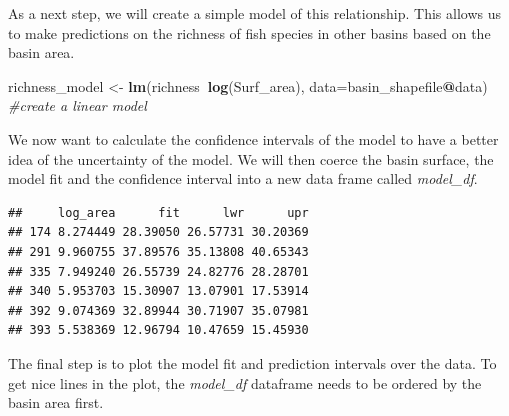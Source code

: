 \documentclass[
]{book}
\newenvironment{Shaded}{\begin{snugshade}}{\end{snugshade}}
\newcommand{\CommentTok}[1]{\textcolor[rgb]{0.56,0.35,0.01}{\textit{#1}}}
\newcommand{\DataTypeTok}[1]{\textcolor[rgb]{0.13,0.29,0.53}{#1}}
\newcommand{\DecValTok}[1]{\textcolor[rgb]{0.00,0.00,0.81}{#1}}
\newcommand{\KeywordTok}[1]{\textcolor[rgb]{0.13,0.29,0.53}{\textbf{#1}}}
\newcommand{\NormalTok}[1]{#1}
\newcommand{\OperatorTok}[1]{\textcolor[rgb]{0.81,0.36,0.00}{\textbf{#1}}}
\newcommand{\StringTok}[1]{\textcolor[rgb]{0.31,0.60,0.02}{#1}}
\begin{document}
As a next step, we will create a simple model of this relationship. This allows us to make predictions on the richness of fish species in other basins based on the basin area.

\begin{Shaded}
\begin{Highlighting}[]
\NormalTok{richness_model <-}\StringTok{ }\KeywordTok{lm}\NormalTok{(richness}\OperatorTok{~}\KeywordTok{log}\NormalTok{(Surf_area), }\DataTypeTok{data=}\NormalTok{basin_shapefile}\OperatorTok{@}\NormalTok{data) }\CommentTok{#create a linear model}
\end{Highlighting}
\end{Shaded}

We now want to calculate the confidence intervals of the model to have a better idea of the uncertainty of the model. We will then coerce the basin surface, the model fit and the confidence interval into a new data frame called \emph{model\_df}.

\begin{Shaded}
\end{Shaded}

\begin{verbatim}
##     log_area      fit      lwr      upr
## 174 8.274449 28.39050 26.57731 30.20369
## 291 9.960755 37.89576 35.13808 40.65343
## 335 7.949240 26.55739 24.82776 28.28701
## 340 5.953703 15.30907 13.07901 17.53914
## 392 9.074369 32.89944 30.71907 35.07981
## 393 5.538369 12.96794 10.47659 15.45930
\end{verbatim}

The final step is to plot the model fit and prediction intervals over the data. To get nice lines in the plot, the \emph{model\_df} dataframe needs to be ordered by the basin area first.
\end{document}
